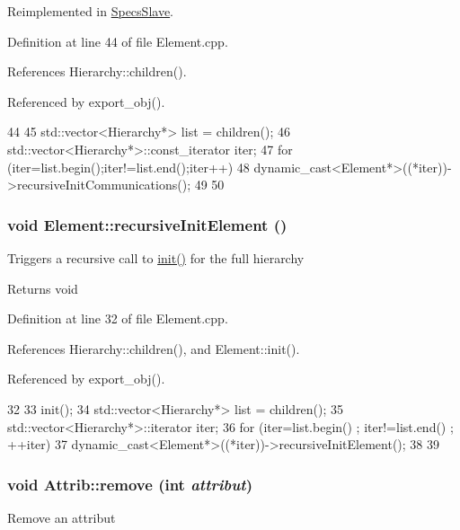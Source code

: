 Reimplemented in \hyperlink{classSpecsSlave_a347b94c2ba660ccde6927fe72590a1bc}{SpecsSlave}.

Definition at line 44 of file Element.cpp.

References Hierarchy::children().

Referenced by export\_\-obj().


\begin{DoxyCode}
44                                          {
45   std::vector<Hierarchy*> list = children();
46   std::vector<Hierarchy*>::const_iterator iter;
47   for (iter=list.begin();iter!=list.end();iter++){
48     dynamic_cast<Element*>((*iter))->recursiveInitCommunications();
49   }
50 }
\end{DoxyCode}
\hypertarget{classElement_a3c0abcb36f8906688bb7e32608df7086}{
\subsubsection[{recursiveInitElement}]{\setlength{\rightskip}{0pt plus 5cm}void Element::recursiveInitElement ()}}
\label{classElement_a3c0abcb36f8906688bb7e32608df7086}
Triggers a recursive call to \hyperlink{classElement_af42754b5cabc198869222725218d695c}{init()} for the full hierarchy

\begin{DoxyReturn}{Returns}
void 
\end{DoxyReturn}


Definition at line 32 of file Element.cpp.

References Hierarchy::children(), and Element::init().

Referenced by export\_\-obj().


\begin{DoxyCode}
32                                   {
33   init();
34   std::vector<Hierarchy*> list = children();
35   std::vector<Hierarchy*>::iterator iter;
36   for (iter=list.begin() ; iter!=list.end() ; ++iter){
37     dynamic_cast<Element*>((*iter))->recursiveInitElement();
38   }
39 }
\end{DoxyCode}
\hypertarget{classAttrib_a7d4ef7e32d93cb287792b87b857e79f3}{
\subsubsection[{remove}]{\setlength{\rightskip}{0pt plus 5cm}void Attrib::remove (int {\em attribut})}}
\label{classAttrib_a7d4ef7e32d93cb287792b87b857e79f3}
Remove an attribut 


